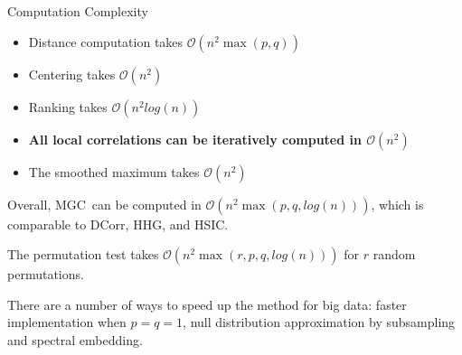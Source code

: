 \documentclass[mathserif,t]{beamer}
\newcommand{\Mgc}{MGC}
\begin{document}
\begin{frame}{Computation Complexity}
\begin{itemize}
\item Distance computation takes $\mathcal{O}(n^2 \max(p,q))$
\item Centering takes $\mathcal{O}(n^2)$
\item Ranking takes $\mathcal{O}(n^2 log(n))$
\item \textbf{All local correlations can be iteratively computed in $\mathcal{O}(n^2)$}
\item The smoothed maximum takes $\mathcal{O}(n^2)$
\end{itemize}

\pause
Overall, \Mgc~can be computed in $\mathcal{O}(n^2 \max(p,q,log(n)))$, which is comparable to DCorr, HHG, and HSIC. 

\pause
\medskip
The permutation test takes $\mathcal{O}(n^2 \max(r,p,q,log(n)))$ for $r$ random permutations.
\pause
\medskip

There are a number of ways to speed up the method for big data: faster implementation when $p=q=1$, null distribution approximation by subsampling and spectral embedding.
\end{frame}
\end{document}
